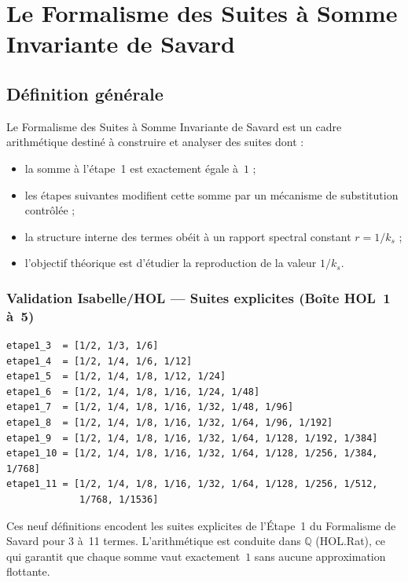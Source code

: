 \documentclass[]{pasj02}
\begin{document}
\section{Le Formalisme des Suites à Somme Invariante de Savard}
\label{sec:formalisme}

\subsection{Définition générale}
\label{ssec:definition}

Le Formalisme des Suites à Somme Invariante de Savard est un cadre
arithmétique destiné à construire et analyser des suites dont :
\begin{itemize}
  \item la somme à l'étape~1 est exactement égale à~$1$ ;
  \item les étapes suivantes modifient cette somme par un mécanisme de
        substitution contrôlée ;
  \item la structure interne des termes obéit à un rapport spectral constant
        $r = 1/k_s$ ;
  \item l'objectif théorique est d'étudier la reproduction de la valeur
        $1/k_s$.
\end{itemize}

\subsubsection*{Validation Isabelle/HOL --- Suites explicites (Boîte HOL~1 à~5)}

\begin{verbatim}
etape1_3  = [1/2, 1/3, 1/6]
etape1_4  = [1/2, 1/4, 1/6, 1/12]
etape1_5  = [1/2, 1/4, 1/8, 1/12, 1/24]
etape1_6  = [1/2, 1/4, 1/8, 1/16, 1/24, 1/48]
etape1_7  = [1/2, 1/4, 1/8, 1/16, 1/32, 1/48, 1/96]
etape1_8  = [1/2, 1/4, 1/8, 1/16, 1/32, 1/64, 1/96, 1/192]
etape1_9  = [1/2, 1/4, 1/8, 1/16, 1/32, 1/64, 1/128, 1/192, 1/384]
etape1_10 = [1/2, 1/4, 1/8, 1/16, 1/32, 1/64, 1/128, 1/256, 1/384, 1/768]
etape1_11 = [1/2, 1/4, 1/8, 1/16, 1/32, 1/64, 1/128, 1/256, 1/512,
             1/768, 1/1536]
\end{verbatim}

Ces neuf définitions encodent les suites explicites de l'Étape~1 du
Formalisme de Savard pour 3 à~11 termes.  L'arithmétique est conduite dans
$\mathbb{Q}$ (HOL.Rat), ce qui garantit que chaque somme vaut exactement~$1$
sans aucune approximation flottante.
\end{document}
